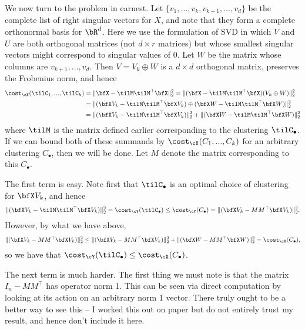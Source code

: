 \begin{homework}[e]
\begin{prf}
\begin{enumerate}[(a)]
      We now turn to the problem in earnest. Let $\{v_1,...,v_k,v_{k+1},...,v_d\}$ be the complete list of right singular vectors for $X$, and note that they form a complete orthonormal basis for $\bR^d$. Here we use the formulation of SVD in which $V$ and $U$ are both orthogonal matrices (not $d\times r$ matrices) but whose smallest singular vectors might correspond to singular values of 0. Let $W$ be the matrix whose columns are $v_{k+1},...,v_d$. Then $V = V_k\oplus W$ is a $d\times d$ orthogonal matrix, preserves the Frobenius norm, and hence
      \begin{align*}
        \cost_\cX(\tilC_1,...,\tilC_k) 
          &= \|\bfX - \tilM\tilM^\top\bfX\|^2_2 = \|(\bfX - \tilM\tilM^\top\bfX)(V_k\oplus W)\|^2_2 \\
          &= \|(\bfX V_k - \tilM\tilM^\top\bfX V_k) \oplus (\bfX W - \tilM\tilM^\top\bfX W)\|^2_2 \\
          &= \|(\bfX V_k - \tilM\tilM^\top\bfX V_k)\|^2_2 + \|(\bfX W - \tilM\tilM^\top \bfX W)\|^2_2
      \end{align*}
      where $\tilM$ is the matrix defined earlier corresponding to the clustering $\tilC_\bullet$. If we can bound both of these summands by $\cost_\cX(C_1,...,C_k)$ for an arbitrary clustering $C_\bullet$, then we will be done. Let $M$ denote the matrix corresponding to this $C_\bullet$.

      The first term is easy. Note first that $\tilC_\bullet$ is an optimal choice of clustering for $\bfX V_k$, and hence
      \begin{align*}
         \|(\bfX V_k - \tilM\tilM^\top\bfX V_k)\|^2_2 = \cost_\cY(\tilC_\bullet)\leq \cost_\cY(C_\bullet) = \|(\bfX V_k - MM^\top\bfX V_k)\|^2_2.
      \end{align*}
      However, by what we have above,
      \begin{align*}
        \|(\bfX V_k - MM^\top\bfX V_k)\|^2_2 \leq \|(\bfX V_k - MM^\top\bfX V_k)\|^2_2 + \|(\bfX W - MM^\top\bfX W)\|^2_2 = \cost_\cX(C_\bullet),
      \end{align*}
      so we have that $\cost_\cY(\tilC_\bullet) \leq \cost_\cX(C_\bullet)$.
    \end{enumerate}

    The next term is much harder. The first thing we must note is that the matrix $I_n - MM^\top$ has operator norm 1. This can be seen via direct computation by looking at its action on an arbitrary norm 1 vector. There truly ought to be a better way to see this -- I worked this out on paper but do not entirely trust my result, and hence don't include it here.


\end{prf}
\end{homework}

